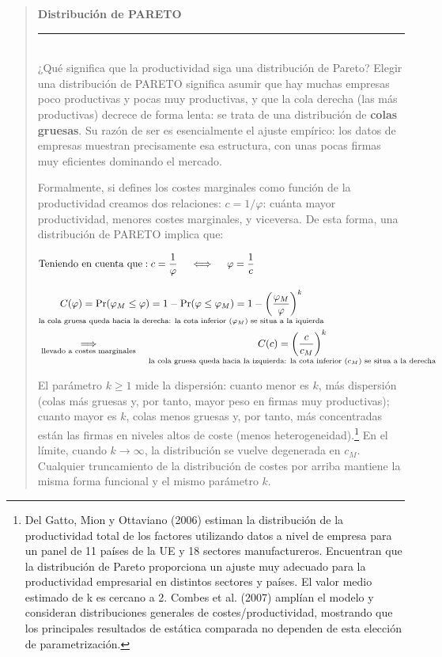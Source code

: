 \documentclass[10pt,a4paper]{article}
\newenvironment{specialblock}[1]{%
      \begin{quote} %
      \small %
      \noindent\textbf{#1}\\[-0.3em] %
      \rule{\linewidth}{0.4pt}\\[0.6em]}{
      \end{quote}}
\begin{document}
\begin{specialblock}{Distribución de PARETO}
    ¿Qué significa que la productividad siga una distribución de Pareto? Elegir una distribución de PARETO significa asumir que hay muchas empresas poco productivas y pocas muy productivas, y que la cola derecha (las más productivas) decrece de forma lenta: se trata de una distribución de \textbf{colas gruesas}. Su razón de ser es esencialmente el ajuste empírico: los datos de empresas muestran precisamente esa estructura, con unas pocas firmas muy eficientes dominando el mercado. 

    Formalmente, si defines los costes marginales como función de la productividad creamos dos relaciones: $c = 1/\varphi$: cuánta mayor productividad, menores costes marginales, y viceversa. De esta forma, una distribución de PARETO implica que:
    
    $$\begin{aligned}
        &\text{Teniendo en cuenta que}: c=\frac{1}{\varphi}\quad\iff\quad \varphi=\frac{1}{c}\\[1em]
        &\underset{\text{\scriptsize la cola gruesa queda hacia la derecha: la cota inferior ($\varphi_M$) se situa a la iquierda}}{C(\varphi)=\Pr(\varphi_M\leq \varphi)=1-\Pr(\varphi\leq\varphi_M)=1-\left(\frac{\varphi_M}{\varphi}\right)^k}\\
        &\underset{\text{\scriptsize llevado a costes marginales}}{\Longrightarrow}\quad \underset{\text{\scriptsize la cola gruesa queda hacia la izquierda: la cota inferior ($c_M$) se situa a la derecha}}{C(c)=\left(\frac{c}{c_M}\right)^k}
    \end{aligned}$$
    
    El parámetro $k\geq1$ mide la dispersión: cuanto menor es $k$, más dispersión (colas más gruesas y, por tanto, mayor peso en firmas muy productivas); cuanto mayor es $k$, colas menos gruesas y, por tanto, más concentradas están las firmas en niveles altos de coste (menos heterogeneidad).\footnote{%
        Del Gatto, Mion y Ottaviano (2006) estiman la distribución de la productividad total de los factores utilizando datos a nivel de empresa para un panel de 11 países de la UE y 18 sectores manufactureros. Encuentran que la distribución de Pareto proporciona un ajuste muy adecuado para la productividad empresarial en distintos sectores y países. El valor medio estimado de k es cercano a 2. Combes et al. (2007) amplían el modelo y consideran distribuciones generales de costes/productividad, mostrando que los principales resultados de estática comparada no dependen de esta elección de parametrización.
    } En el límite, cuando $k\to\infty$, la distribución se vuelve degenerada en $c_M$. Cualquier truncamiento de la distribución de costes por arriba mantiene la misma forma funcional y el mismo parámetro $k$. 
    

\end{specialblock}
\end{document}
